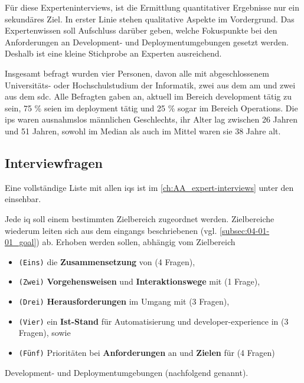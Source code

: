 Für diese Experteninterviews, ist die Ermittlung quantitativer Ergebnisse nur ein sekundäres Ziel. In erster Linie stehen qualitative Aspekte im Vordergrund. Das Expertenwissen soll Aufschluss darüber geben, welche Fokuspunkte bei den Anforderungen an Development- und Deploymentumgebungen gesetzt werden. Deshalb ist eine kleine Stichprobe an Experten ausreichend.

Insgesamt befragt wurden vier Personen, davon alle mit abgeschlossenem Universitäts- oder Hochschulstudium der Informatik, zwei aus dem \Gls{am} und zwei aus dem \Gls{sdc}. Alle Befragten gaben an, aktuell im Bereich \Gls{development} tätig zu sein, 75 \% seien im \Gls{deployment} tätig und 25 \% sogar im Bereich Operations. Die \Glspl{ip} waren ausnahmslos männlichen Geschlechts, ihr Alter lag zwischen 26 Jahren und 51 Jahren, sowohl im Median als auch im Mittel waren sie 38 Jahre alt.

\subsection{Interviewfragen}
\label{subsec:04-01-03_interview-questions}

Eine vollständige Liste mit allen \Glspl{iq} ist im \autoref{ch:AA_expert-interviews} unter den  einsehbar.

Jede \acrfull{iq} soll einem bestimmten Zielbereich zugeordnet werden. Zielbereiche wiederum leiten sich aus dem eingangs beschriebenen  (vgl. \autoref{subsec:04-01-01_goal}) ab. Erhoben werden sollen, abhängig vom Zielbereich

\begin{itemize}
    \item \texttt{(Eins)} die \textbf{Zusammensetzung} von (4 Fragen),
    \item \texttt{(Zwei)} \textbf{Vorgehensweisen} und \textbf{Interaktionswege} mit (1 Frage),
    \item \texttt{(Drei)} \textbf{Herausforderungen} im Umgang mit (3 Fragen),
    \item \texttt{(Vier)} ein \textbf{Ist-Stand} für Automatisierung und \Gls{developer-experience} in (3 Fragen), sowie
    \item \texttt{(Fünf)} Prioritäten bei \textbf{Anforderungen} an und \textbf{Zielen} für (4 Fragen)
\end{itemize}

Development- und Deploymentumgebungen (nachfolgend  genannt).

